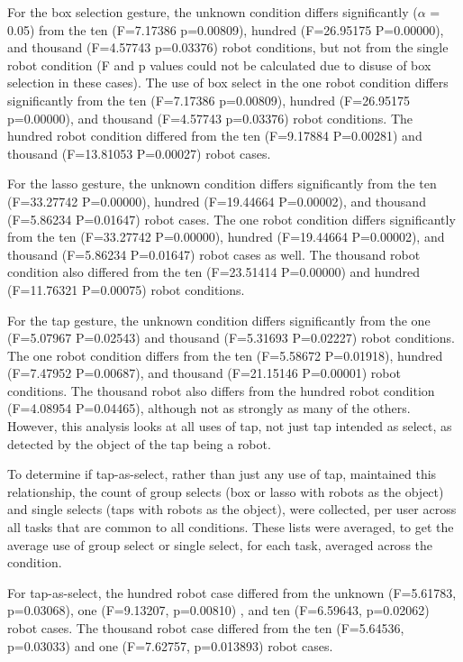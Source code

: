 For the box selection gesture, the unknown condition differs significantly ($\alpha$ = 0.05) from the ten (F=7.17386 p=0.00809), hundred (F=26.95175 P=0.00000), and thousand (F=4.57743 p=0.03376) robot conditions, but not from the single robot condition (F and p values could not be calculated due to disuse of box selection in these cases). 
The use of box select in the one robot condition differs significantly from the ten (F=7.17386 p=0.00809), hundred (F=26.95175 p=0.00000), and thousand (F=4.57743 p=0.03376) robot conditions.
The hundred robot condition differed from the ten (F=9.17884 P=0.00281) and thousand (F=13.81053 P=0.00027) robot cases. 

For the lasso gesture, the unknown condition differs significantly from the ten (F=33.27742 P=0.00000), hundred (F=19.44664 P=0.00002), and thousand (F=5.86234 P=0.01647) robot cases. 
The one robot condition differs significantly from the ten (F=33.27742 P=0.00000), hundred (F=19.44664 P=0.00002), and thousand (F=5.86234 P=0.01647) robot cases as well. 
The thousand robot condition also differed from the ten (F=23.51414 P=0.00000) and hundred (F=11.76321 P=0.00075) robot conditions. 

For the tap gesture, the unknown condition differs significantly from the one (F=5.07967 P=0.02543) and thousand (F=5.31693 P=0.02227) robot conditions. 
The one robot condition differs from the ten (F=5.58672 P=0.01918), hundred (F=7.47952 P=0.00687), and thousand (F=21.15146 P=0.00001) robot conditions. 
The thousand robot also differs from the hundred robot condition (F=4.08954 P=0.04465), although not as strongly as many of the others. 
However, this analysis looks at all uses of tap, not just tap intended as select, as detected by the object of the tap being a robot.

To determine if tap-as-select, rather than just any use of tap, maintained this relationship, the count of group selects (box or lasso with robots as the object) and single selects (taps with robots as the object), were collected, per user across all tasks that are common to all conditions. 
These lists were averaged, to get the average use of group select or single select, for each task, averaged across the condition.
 
For tap-as-select, the hundred robot case differed from the unknown (F=5.61783, p=0.03068), one (F=9.13207, p=0.00810) , and ten (F=6.59643, p=0.02062) robot cases. The thousand robot case differed from the ten (F=5.64536, p=0.03033) and one (F=7.62757, p=0.013893) robot cases.

